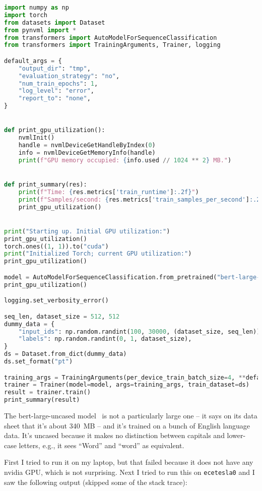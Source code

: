 \begin{lstlisting}[language=python]
import numpy as np
import torch
from datasets import Dataset
from pynvml import *
from transformers import AutoModelForSequenceClassification
from transformers import TrainingArguments, Trainer, logging

default_args = {
    "output_dir": "tmp",
    "evaluation_strategy": "no",
    "num_train_epochs": 1,
    "log_level": "error",
    "report_to": "none",
}


def print_gpu_utilization():
    nvmlInit()
    handle = nvmlDeviceGetHandleByIndex(0)
    info = nvmlDeviceGetMemoryInfo(handle)
    print(f"GPU memory occupied: {info.used // 1024 ** 2} MB.")


def print_summary(res):
    print(f"Time: {res.metrics['train_runtime']:.2f}")
    print(f"Samples/second: {res.metrics['train_samples_per_second']:.2f}")
    print_gpu_utilization()


print("Starting up. Initial GPU utilization:")
print_gpu_utilization()
torch.ones((1, 1)).to("cuda")
print("Initialized Torch; current GPU utilization:")
print_gpu_utilization()

model = AutoModelForSequenceClassification.from_pretrained("bert-large-uncased").to("cuda")
print_gpu_utilization()

logging.set_verbosity_error()

seq_len, dataset_size = 512, 512
dummy_data = {
    "input_ids": np.random.randint(100, 30000, (dataset_size, seq_len)),
    "labels": np.random.randint(0, 1, dataset_size),
}
ds = Dataset.from_dict(dummy_data)
ds.set_format("pt")

training_args = TrainingArguments(per_device_train_batch_size=4, **default_args)
trainer = Trainer(model=model, args=training_args, train_dataset=ds)
result = trainer.train()
print_summary(result)
\end{lstlisting}

The bert-large-uncased model~\cite{bert} is not a particularly large one -- it says on its data sheet that it's about 340~MB -- and it's trained on a bunch of English language data. It's uncased because it makes no distinction between capitals and lower-case letters, e.g., it sees ``Word'' and ``word'' as equivalent.

First I tried to run it on my laptop, but that failed because it does not have any nvidia GPU, which is not surprising. Next I tried to run this on \texttt{ecetesla0} and I saw the following output (skipped some of the stack trace):

